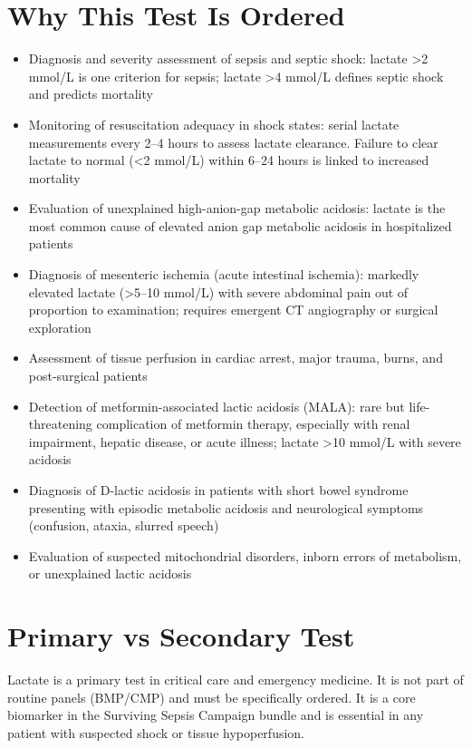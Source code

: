 \section*{Why This Test Is Ordered}
\begin{itemize}
  \item Diagnosis and severity assessment of sepsis and septic shock: lactate >2 mmol/L is one criterion for sepsis; lactate >4 mmol/L defines septic shock and predicts mortality
  \item Monitoring of resuscitation adequacy in shock states: serial lactate measurements every 2--4 hours to assess lactate clearance. Failure to clear lactate to normal (<2 mmol/L) within 6--24 hours is linked to increased mortality
  \item Evaluation of unexplained high-anion-gap metabolic acidosis: lactate is the most common cause of elevated anion gap metabolic acidosis in hospitalized patients
  \item Diagnosis of mesenteric ischemia (acute intestinal ischemia): markedly elevated lactate (>5--10 mmol/L) with severe abdominal pain out of proportion to examination; requires emergent CT angiography or surgical exploration
  \item Assessment of tissue perfusion in cardiac arrest, major trauma, burns, and post-surgical patients
  \item Detection of metformin-associated lactic acidosis (MALA): rare but life-threatening complication of metformin therapy, especially with renal impairment, hepatic disease, or acute illness; lactate >10 mmol/L with severe acidosis
  \item Diagnosis of D-lactic acidosis in patients with short bowel syndrome presenting with episodic metabolic acidosis and neurological symptoms (confusion, ataxia, slurred speech)
  \item Evaluation of suspected mitochondrial disorders, inborn errors of metabolism, or unexplained lactic acidosis
\end{itemize}

\section*{Primary vs Secondary Test}
Lactate is a primary test in critical care and emergency medicine. It is not part of routine panels (BMP/CMP) and must be specifically ordered. It is a core biomarker in the Surviving Sepsis Campaign bundle and is essential in any patient with suspected shock or tissue hypoperfusion.

